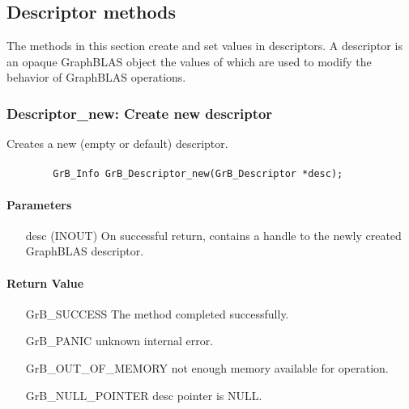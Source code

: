 \subsection{Descriptor methods}

The methods in this section create and set values in descriptors. 
A descriptor is an opaque GraphBLAS object the values of which are used to
modify the behavior of  GraphBLAS operations.

\subsubsection{{\sf Descriptor\_new}: Create new descriptor}

Creates a new (empty or default) descriptor.

\paragraph{\syntax}

\begin{verbatim}
        GrB_Info GrB_Descriptor_new(GrB_Descriptor *desc);
\end{verbatim}

\paragraph{Parameters}

\begin{itemize}[leftmargin=1.1in]
    \item[{\sf desc}] ({\sf INOUT}) On successful return, contains a 
    handle to the newly created GraphBLAS descriptor.
\end{itemize}

\paragraph{Return Value}

\begin{itemize}[leftmargin=2.1in]
\item[{\sf GrB\_SUCCESS}]  The method completed successfully.
\item[{\sf GrB\_PANIC}]             unknown internal error.
\item[{\sf GrB\_OUT\_OF\_MEMORY}]          not enough memory available for operation.
\item[{\sf GrB\_NULL\_POINTER}]    {\sf desc} pointer is {\sf NULL}.
\end{itemize}

